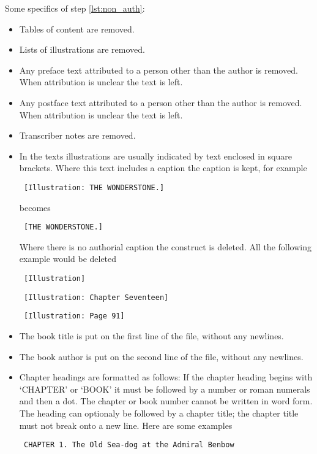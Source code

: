 \documentclass[a4paper,10pt]{paper}
\begin{document}
Some specifics of step \ref{lst:non_auth}:
\begin{itemize}
    \item Tables of content are removed.
    \item Lists of illustrations are removed.
    \item Any preface text attributed to a person other than the author is removed. When attribution is unclear the text is left.
    \item Any postface text attributed to a person other than the author is removed. When attribution is unclear the text is left.
    \item Transcriber notes are removed.
    \item In the texts illustrations are usually indicated by text enclosed in square brackets.
          Where this text includes a caption the caption is kept, for example
        \begin{verbatim} [Illustration: THE WONDERSTONE.] \end{verbatim}
          becomes
        \begin{verbatim} [THE WONDERSTONE.] \end{verbatim}
          Where there is no authorial caption the construct is deleted.
          All the following example would be deleted
        \begin{verbatim} [Illustration] \end{verbatim}
        \begin{verbatim} [Illustration: Chapter Seventeen] \end{verbatim}
        \begin{verbatim} [Illustration: Page 91] \end{verbatim}
    \item The book title is put on the first line of the file, without any newlines.
    \item The book author is put on the second line of the file, without any newlines.
    \item Chapter headings are formatted as follows:
        If the chapter heading begins with `CHAPTER' or `BOOK' it must be followed by a number or roman numerals and then a dot.
        The chapter or book number cannot be written in word form.
        The heading can optionaly be followed by a chapter title; the chapter title must not break onto a new line.
        Here are some examples
        \begin{verbatim} CHAPTER 1. The Old Sea-dog at the Admiral Benbow\end{verbatim}

\end{itemize}
\end{document}
